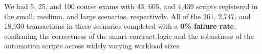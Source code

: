 \documentclass[conference]{IEEEtran}
\begin{document}

We had 5, 25, and 100 course exams with 43, 605, and 4,439 scripts registered in the small, medium, and large
scenarios, respectively. All of the 261, 2,747, and 18,930 transactions in these scenarios completed with a \textbf{0\% failure rate}, confirming
the correctness of the smart-contract logic and the robustness of the
automation scripts across widely varying workload sizes.
\end{document}
